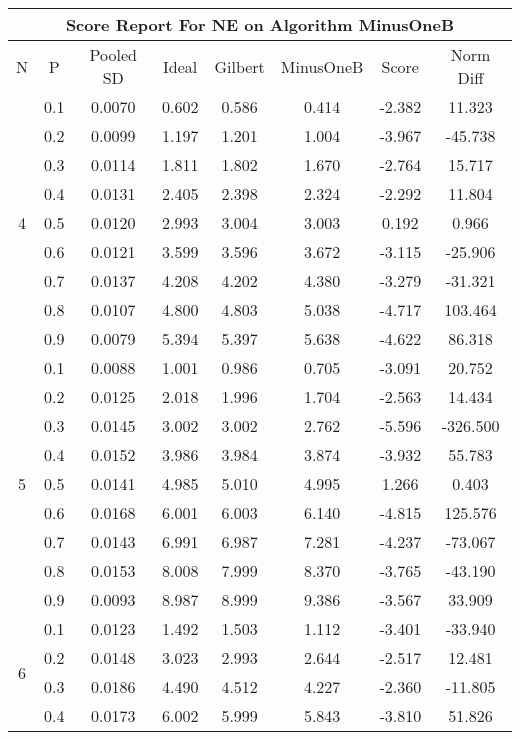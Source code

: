 \documentclass[11pt,a4paper]{report}
\begin{document}
\begin{longtable}{ | c | c || c | c | c | c | c | c | }
\hline
\multicolumn{8}{|c|}{ Score Report For NE on Algorithm MinusOneB} \\
\hline
N & P & Pooled SD &  Ideal &  Gilbert & MinusOneB  & Score & Norm Diff \\
 \hline
 \hline
 \endhead
\multirow{9}{*}{4} & 0.1 & 0.0070 & 0.602 & 0.586 & 0.414 & -2.382 & 11.323 \\
 & 0.2 & 0.0099 & 1.197 & 1.201 & 1.004 & -3.967 & -45.738 \\
 & 0.3 & 0.0114 & 1.811 & 1.802 & 1.670 & -2.764 & 15.717 \\
 & 0.4 & 0.0131 & 2.405 & 2.398 & 2.324 & -2.292 & 11.804 \\
 & 0.5 & 0.0120 & 2.993 & 3.004 & 3.003 & 0.192 & 0.966 \\
 & 0.6 & 0.0121 & 3.599 & 3.596 & 3.672 & -3.115 & -25.906 \\
 & 0.7 & 0.0137 & 4.208 & 4.202 & 4.380 & -3.279 & -31.321 \\
 & 0.8 & 0.0107 & 4.800 & 4.803 & 5.038 & -4.717 & 103.464 \\
 & 0.9 & 0.0079 & 5.394 & 5.397 & 5.638 & -4.622 & 86.318 \\
 \hline
\multirow{9}{*}{5} & 0.1 & 0.0088 & 1.001 & 0.986 & 0.705 & -3.091 & 20.752 \\
 & 0.2 & 0.0125 & 2.018 & 1.996 & 1.704 & -2.563 & 14.434 \\
 & 0.3 & 0.0145 & 3.002 & 3.002 & 2.762 & -5.596 & -326.500 \\
 & 0.4 & 0.0152 & 3.986 & 3.984 & 3.874 & -3.932 & 55.783 \\
 & 0.5 & 0.0141 & 4.985 & 5.010 & 4.995 & 1.266 & 0.403 \\
 & 0.6 & 0.0168 & 6.001 & 6.003 & 6.140 & -4.815 & 125.576 \\
 & 0.7 & 0.0143 & 6.991 & 6.987 & 7.281 & -4.237 & -73.067 \\
 & 0.8 & 0.0153 & 8.008 & 7.999 & 8.370 & -3.765 & -43.190 \\
 & 0.9 & 0.0093 & 8.987 & 8.999 & 9.386 & -3.567 & 33.909 \\
 \hline
\multirow{9}{*}{6} & 0.1 & 0.0123 & 1.492 & 1.503 & 1.112 & -3.401 & -33.940 \\
 & 0.2 & 0.0148 & 3.023 & 2.993 & 2.644 & -2.517 & 12.481 \\
 & 0.3 & 0.0186 & 4.490 & 4.512 & 4.227 & -2.360 & -11.805 \\
 & 0.4 & 0.0173 & 6.002 & 5.999 & 5.843 & -3.810 & 51.826 \\

\end{longtable}
\end{document}
